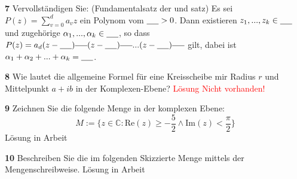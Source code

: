 \documentclass[11pt]{article}
\begin{document}
    \textbf{7} Vervollständigen Sie:
    (Fundamentalsatz der \underline{\hspace{2cm}} und \underline{\hspace{2cm}} satz) Es sei
    \( P(z) = \sum_{v=0}^{d} a_v z \)
    ein Polynom vom \( \underline{\hspace{0.5cm}} > 0 \). Dann existieren \( z_1, ..., z_k \in \underline{\hspace{0.5cm}} \) und zugehörige \( \alpha_1, ..., \alpha_k \in \underline{\hspace{0.5cm}} \), so dass
    \( P(z) = a_d (z-\underline{\hspace{0.5cm}})^{\underline{\hspace{0.5cm}}} (z-\underline{\hspace{0.5cm}})^{\underline{\hspace{0.5cm}}} ... (z-\underline{\hspace{0.5cm}})^{\underline{\hspace{0.5cm}}} \)
    gilt, dabei ist \( \alpha_1 + \alpha_2 + ... + \alpha_k = \underline{\hspace{0.5cm}} \).\newline

    \textbf{8} Wie lautet die allgemeine Formel für eine Kreisscheibe mir Radius $r$ und Mittelpunkt $a + ib$ in der Komplexen-Ebene?\newline
    \textcolor{red}{Lösung Nicht vorhanden!}\newline

    \textbf{9} Zeichnen Sie die folgende Menge in der komplexen Ebene:
    \[ M := \{ z \in \mathbb{C} : \text{Re}(z) \geq -\frac{5}{2} \land \text{Im}(z) < \frac{\pi}{2} \} \]\newline
    Lösung in Arbeit\newline

    \textbf{10} Beschreiben Sie die im folgenden Skizzierte Menge mittels der Mengenschreibweise.\newline
    Lösung in Arbeit\newline
\end{document}
